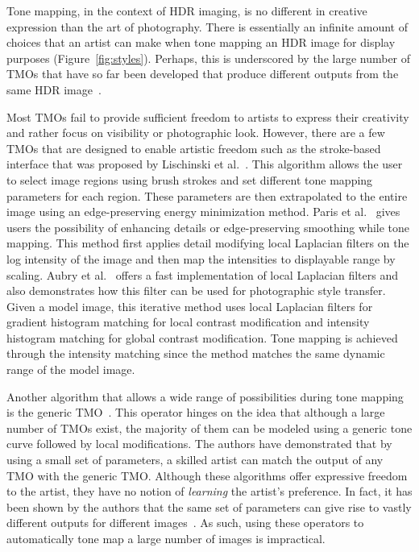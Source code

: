 Tone mapping, in the context of HDR imaging, is no different in creative expression than the art of photography. There is essentially an infinite amount of choices that an artist can make when tone mapping an HDR image for display purposes (Figure~\ref{fig:styles}). Perhaps, this is underscored by the large number of TMOs that have so far been developed that produce different outputs from the same HDR image~\cite{Rein2010}.

Most TMOs fail to provide sufficient freedom to artists to express their creativity and rather focus on visibility or photographic look. However, there are a few TMOs that are designed to enable artistic freedom such as the stroke-based interface that was proposed by Lischinski et al.~\cite{Lischinski2006}. This algorithm allows the user to select image regions using brush strokes and set different tone mapping parameters for each region. These parameters are then extrapolated to the entire image using an edge-preserving energy minimization method. Paris et al.~\cite{paris2011local} gives users the possibility of enhancing details or edge-preserving smoothing while tone mapping. This method first applies detail modifying local Laplacian filters on the log intensity of the image and then map the intensities to displayable range by scaling. Aubry et al.~\cite{aubry2014fast} offers a fast implementation of local Laplacian filters and also demonstrates how this filter can be used for photographic style transfer. Given a model image, this iterative method uses local Laplacian filters for gradient histogram matching for local contrast modification and intensity histogram matching for global contrast modification. Tone mapping is achieved through the intensity matching since the method matches the same dynamic range of the model image.

Another algorithm that allows a wide range of possibilities during tone mapping is the generic TMO~\cite{Mantiuk08a}. This operator hinges on the idea that although a large number of TMOs exist, the majority of them can be modeled using a generic tone curve followed by local modifications. The authors have demonstrated that by using a small set of parameters, a skilled artist can match the output of any TMO with the generic TMO. Although these algorithms offer expressive freedom to the artist, they have no notion of \emph{learning} the artist's preference. In fact, it has been shown by the authors that the same set of parameters can give rise to vastly different outputs for different images~\cite{Mantiuk08a}. As such, using these operators to automatically tone map a large number of images is impractical. 

